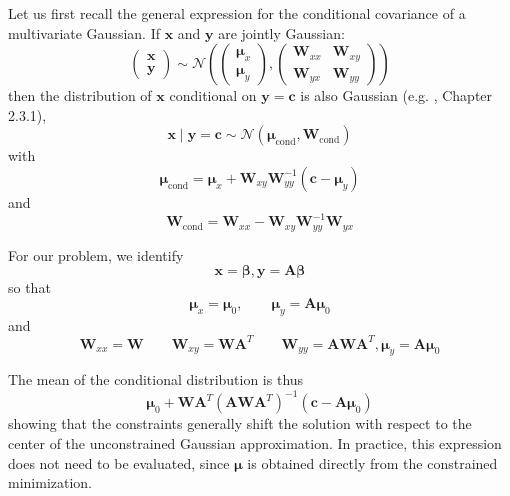 Let us first recall the general expression for the conditional 
covariance of a multivariate Gaussian. If $\mathbf{x}$ and $\mathbf{y}$ are jointly 
Gaussian: 
\begin{equation}
    \begin{pmatrix} \mathbf{x} \\ \mathbf{y} \end{pmatrix}
    \sim \mathcal{N}(
        \begin{pmatrix}\boldsymbol{\mu}_x\\ \boldsymbol{\mu}_y\end{pmatrix}, 
        \begin{pmatrix} \mathbf{W}_{xx} & 
            \mathbf{W}_{xy} \\ \mathbf{W}_{yx} & \mathbf{W}_{yy}\end{pmatrix})
\end{equation}
then the distribution of $\mathbf{x}$ 
conditional on $\mathbf{y}=\mathbf{c}$ is also Gaussian (e.g. \cite{Bishop_2006}, Chapter 2.3.1), 
\begin{equation}
    \mathbf{x} \mid \mathbf{y}=\mathbf{c} \sim \mathcal{N}(\boldsymbol{\mu}_{\text{cond}},\mathbf{W}_{\text{cond}})
\end{equation}
with
\begin{equation}
    \boldsymbol{\mu}_{\text{cond}} = \boldsymbol{\mu}_x + \mathbf{W}_{xy}\mathbf{W}_{yy}^{-1}(\mathbf{c}-\boldsymbol{\mu}_y)
\end{equation}
and 
\begin{equation}
    \mathbf{W}_{\text{cond}} = \mathbf{W}_{xx} - \mathbf{W}_{xy} \mathbf{W}_{yy}^{-1} \mathbf{W}_{yx}
\end{equation}

For our problem, we identify 
\begin{equation}
    \mathbf{x}= \boldsymbol{\beta}, \mathbf{y}=\mathbf{A} \boldsymbol{\beta}
\end{equation}
so that 
\begin{equation}
    \boldsymbol{\mu}_x = \boldsymbol{\mu}_0, \qquad \boldsymbol{\mu}_y = \mathbf{A} \boldsymbol{\mu}_0
\end{equation}
and
\begin{equation}
    \mathbf{W}_{xx} = \mathbf{W} \qquad \mathbf{W}_{xy} = \mathbf{W} \mathbf{A}^T \qquad \mathbf{W}_{yy} = \mathbf{A} \mathbf{W} \mathbf{A}^T, \boldsymbol{\mu}_y = \mathbf{A} \boldsymbol{\mu}_0
\end{equation}


The mean of the conditional distribution is thus 
\begin{equation}
    \boldsymbol{\mu}_0 + \mathbf{W}\mathbf{A}^T(\mathbf{A}\mathbf{W}\mathbf{A}^T)^{-1}(\mathbf{c}-\mathbf{A}\boldsymbol{\mu}_0)
\end{equation}
showing that the constraints generally 
shift the solution with respect to the center of the unconstrained 
Gaussian approximation. In practice, this expression does not need to 
be evaluated, since $\boldsymbol{\mu}$ is obtained directly from the constrained 
minimization. 

